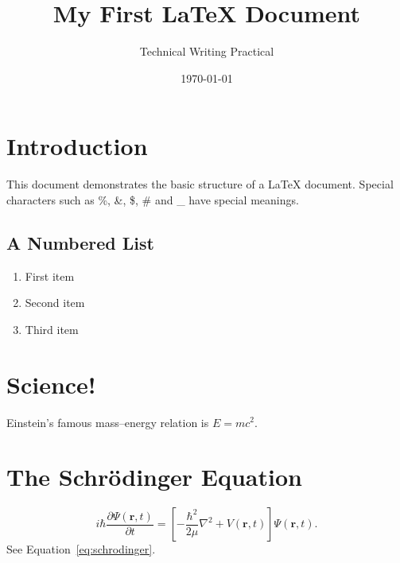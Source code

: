 \documentclass[12pt,a4paper]{article}
\title{My First \LaTeX{} Document}
\author{Technical Writing Practical}
\date{\today}
\begin{document}
\maketitle
\tableofcontents
\section{Introduction}
This document demonstrates the basic structure of a \LaTeX{} document.
Special characters such as \%, \&, \$, \# and \_ have special meanings.
\subsection{A Numbered List}
\begin{enumerate}
\item First item
\item Second item
\item Third item
\end{enumerate}
\section{Science!}
Einstein's famous mass--energy relation is \(E=mc^2\).
\section{The Schrödinger Equation}
\begin{equation}
i\hbar\frac{\partial\Psi(\mathbf r,t)}{\partial t}
=\left[-\frac{\hbar^2}{2\mu}\nabla^2+V(\mathbf r,t)\right]\Psi(\mathbf r,t).
\label{eq:schrodinger}
\end{equation}
See Equation~\ref{eq:schrodinger}.
\end{document}
